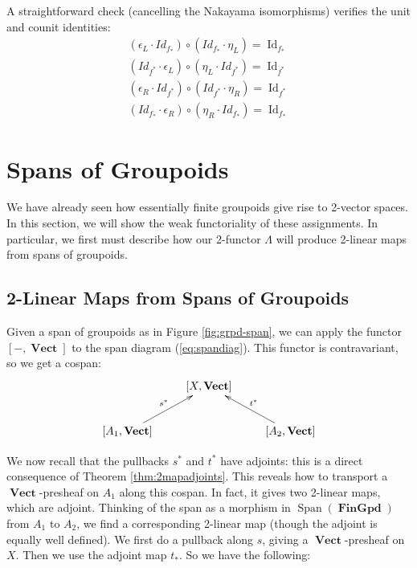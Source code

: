 \documentclass[10pt]{amsart}
\numberwithin{theorem}{subsection}
\newcommand{\opname}[1]{\operatorname{#1}}
\newcommand{\catname}[1]{\boldsymbol{\opname{{#1}}}}
\newcommand{\Id}{\opname{Id}}
\newcommand{\Span}{\opname{Span}}
\newcommand{\V}{\catname{Vect}}
\newcommand{\Gpd}{\catname{FinGpd}}
\newcommand{\HV}[1]{[#1,\V]}
\newcommand{\FV}{\Lambda}
\begin{document}
A straightforward check (cancelling the Nakayama isomorphisms) verifies the unit and counit identities:
\begin{align}
(\epsilon_L \cdot Id_{f_{\ast}} ) \circ (Id_{f_{\ast}} \cdot \eta_L) = \Id_{f_{\ast}} \\
(Id_{f^{\ast}} \cdot \epsilon_L) \circ (\eta_L \cdot Id_{f^{\ast}}) = \Id_{f^{\ast}} \\
(\epsilon_R \cdot Id_{f^{\ast}} ) \circ (Id_{f^{\ast}} \cdot \eta_R) = \Id_{f^{\ast}} \\
(Id_{f_{\ast}} \cdot \epsilon_R) \circ (\eta_R \cdot Id_{f_{\ast}}) = \Id_{f_{\ast}}
\end{align}

\section{Spans of Groupoids}\label{sec:spans}

We have already seen how essentially finite groupoids give rise to
2-vector spaces.  In this section, we will show the weak functoriality
of these assignments.  In particular, we first must describe how our
2-functor $\FV$ will produce 2-linear maps from spans of groupoids.

\subsection{2-Linear Maps from Spans of Groupoids}\label{sec:span2lin}

Given a span of groupoids as in Figure \ref{fig:grpd-span}, we can
apply the functor $[ - , \V ]$ to the span diagram
(\ref{eq:spandiag}).  This functor is contravariant, so we get a
cospan:
\begin{equation}\label{eq:zstep3}
\xymatrix{
  & \HV{X} & \\
\HV{A_1} \ar[ur]^{s^{\ast}} & & \HV{A_2} \ar[ul]_{t^{\ast}} \\
}
\end{equation}

We now recall that the pullbacks $s^{\ast}$ and $t^{\ast}$ have
adjoints: this is a direct consequence of Theorem
\ref{thm:2mapadjoints}.  This reveals how to transport a $\V$-presheaf
on $A_1$ along this cospan.  In fact, it gives two 2-linear maps,
which are adjoint.  Thinking of the span as a morphism in
$\Span(\Gpd)$ from $A_1$ to $A_2$, we find a corresponding
2-linear map (though the adjoint is equally well defined).  We first
do a pullback along $s$, giving a $\V$-presheaf on $X$.  Then we use
the adjoint map $t_{\ast}$.  So we have the following:
\end{document}
